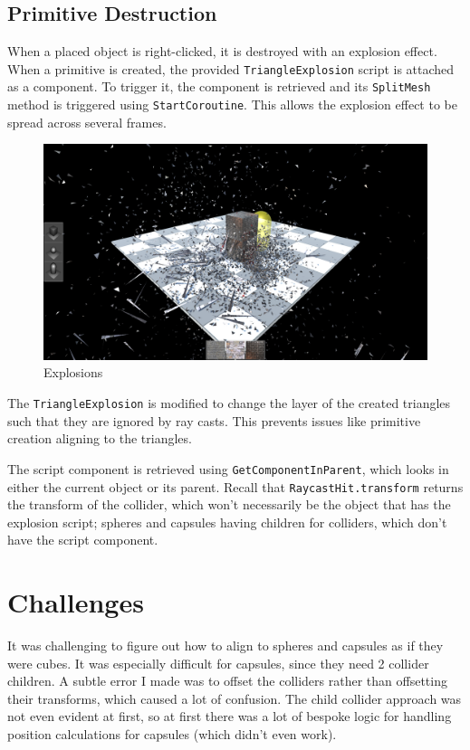 \documentclass[a4paper, 12pt]{scrartcl}
\begin{document}
\subsection{Primitive Destruction}
When a placed object is right-clicked, it is destroyed with an explosion effect. When a primitive is created, the provided \texttt{TriangleExplosion} script is attached as a component. To trigger it, the component is retrieved and its \texttt{SplitMesh} method is triggered using \texttt{StartCoroutine}. This allows the explosion effect to be spread across several frames.

\begin{figure}[htp]
  \centering
  \includegraphics[width=\linewidth]{images/05_explosion.png}
  \caption{Explosions}
\end{figure}

The \texttt{TriangleExplosion} is modified to change the layer of the created triangles such that they are ignored by ray casts. This prevents issues like primitive creation aligning to the triangles.

The script component is retrieved using \texttt{GetComponentInParent}, which looks in either the current object or its parent. Recall that \texttt{RaycastHit.transform} returns the transform of the collider, which won't necessarily be the object that has the explosion script; spheres and capsules having children for colliders, which don't have the script component.

\section{Challenges}
It was challenging to figure out how to align to spheres and capsules as if they were cubes. It was especially difficult for capsules, since they need 2 collider children. A subtle error I made was to offset the colliders rather than offsetting their transforms, which caused a lot of confusion. The child collider approach was not even evident at first, so at first there was a lot of bespoke logic for handling position calculations for capsules (which didn't even work).
\end{document}
